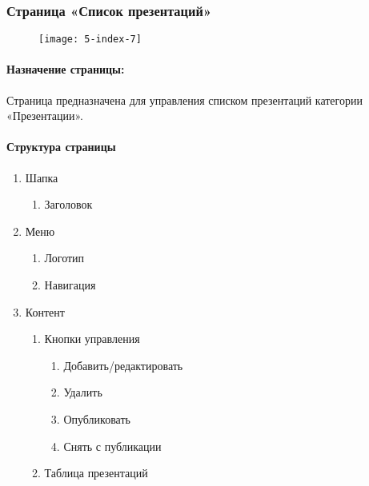 \subsubsection{Страница «Список презентаций»}
\begin{figure}[H]
\texttt{[image: 5-index-7]}
\end{figure}
\paragraph{Назначение страницы:} Страница предназначена для управления списком презентаций категории «Презентации».

\paragraph{Структура страницы}
\begin{enumerate}
	\item Шапка
	\begin{enumerate}
		\item Заголовок
	\end{enumerate}

	\item Меню
	\begin{enumerate}
		\item Логотип
		\item Навигация
	\end{enumerate}

	\item Контент
	\begin{enumerate}
		\item Кнопки управления
		\begin{enumerate}
			\item Добавить/редактировать
			\item Удалить
			\item Опубликовать
			\item Снять с публикации
		\end{enumerate}
		\item Таблица презентаций
	\end{enumerate}
\end{enumerate}

